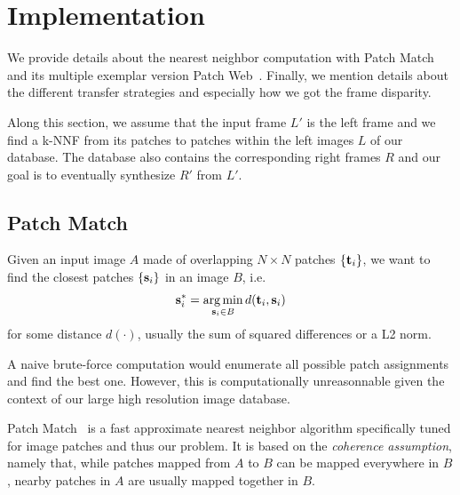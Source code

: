 
\section{Implementation}

We provide details about the nearest neighbor computation with Patch Match~\cite{Barnes09} and its multiple exemplar version Patch Web~\cite{Barnes11}.
Finally, we mention details about the different transfer strategies and especially how we got the frame disparity.

Along this section, we assume that the input frame $L'$ is the left frame and we find a k-NNF from its patches to patches within the left images $L$ of our database. The database also contains the corresponding right frames $R$ and our goal is to eventually synthesize $R'$ from $L'$.

\subsection{Patch Match}

Given an input image $A$ made of overlapping $N\times N$ patches $\{\mathbf{t}_i\}$, we want to find the closest patches $\{\mathbf{s}_i\}$ in an image $B$, i.e.
\begin{equation}
	\mathbf{s}_i^{*} = \operatorname*{arg\,min}_{\mathbf{s}_i \in B} d(\mathbf{t}_i, \mathbf{s}_i)
\end{equation}
for some distance $d(\cdot)$, usually the sum of squared differences or a L2 norm.

A naive brute-force computation would enumerate all possible patch assignments and find the best one.
However, this is computationally unreasonnable given the context of our large high resolution image database.

Patch Match~\cite{Barnes09} is a fast approximate nearest neighbor algorithm specifically tuned for image patches and thus our problem.
It is based on the \emph{coherence assumption}, namely that, while patches mapped from $A$ to $B$ can be mapped everywhere in $B$, nearby patches in $A$ are usually mapped together in $B$.

